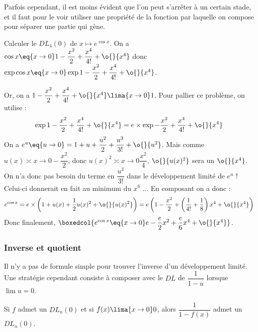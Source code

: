 \documentclass[a4paper,french,bookmarks]{article}
\begin{document}
Parfois cependant, il est moins évident que l'on peut s'arrêter à un certain stade, et il faut pour le voir utiliser une propriété de la fonction par laquelle on compose pour séparer une partie qui gène.

\begin{example}{}{}
    Calculer le $DL_4(0)$ de $x \mapsto e^{\cos{x}}$.
    \tcblower
    On a $\cos{x} \eq{x \to 0} 1 - \dfrac{x^2}{2} + \dfrac{x^4}{4!} + \o{}{x^4}$ donc $\exp{\cos x} \eq{x \to 0} \exp{1 - \dfrac{x^2}{2} + \dfrac{x^4}{4!} + \o{}{x^4}}$.
    
    Or, on a $1 - \dfrac{x^2}{2} + \dfrac{x^4}{4!} + \o{}{x^4} \lima{x \to 0} 1$. Pour pallier ce problème, on utilise :
    \[ \exp{1 - \dfrac{x^2}{2} + \dfrac{x^4}{4!} + \o{}{x^4}} = e\times\exp{- \dfrac{x^2}{2} + \dfrac{x^4}{4!} + \o{}{x^4}}\]
    On a $e^u \eq{u \to 0} = 1 + u + \dfrac{u^2}{2} + \dfrac{u^3}{3!} + \o{}{u^2}$.
    Mais comme $u(x) \asymp{x \to 0} -\dfrac{x^2}{2}$, donc $u(x)^2 \asymp{x \to 0} \dfrac{x^2}{4}$, $\o{}{u(x)^2}$ sera un $\o{}{x^4}$. On n'a donc pas besoin du terme en $\dfrac{u^3}{3!}$ dans le développement limité de $e^u$ ! Celui-ci donnerait en fait au minimum du $x^6$ ... En composant on a donc :
    \[ e^{\cos{x}} = e \times \left(1+u(x)+\dfrac{1}{2}u(x)^2+\o{}{u(x)^2}\right) = e\left(1-\dfrac{x^2}{2}+\left(\dfrac{1}{4!}+\dfrac{1}{8}\right)x^4 + \o{}{x^4}\right)\]
    Donc finalement, $\boxedcol{e^{\cos{x}} \eq{x \to 0} e - \dfrac{e}{2}x^2+\dfrac{e}{6}x^4+\o{}{x^4}}$.
\end{example}

\subsubsection{Inverse et quotient}

Il n'y a pas de formule simple pour trouver l'inverse d'un développement limité. Une stratégie cependant consiste à composer avec le $DL$ de $\dfrac{1}{1-u}$ lorsque $\lim u = 0$.

\begin{property}{}{}
    Si $f$ admet un $DL_n(0)$ et si $f(x) \lima{x \to 0} 0$, alors $\dfrac{1}{1-f(x)}$ admet un $DL_n(0)$.
\end{property}

\end{document}
